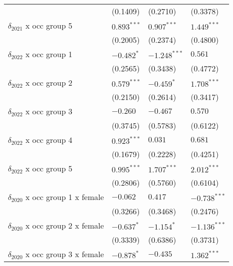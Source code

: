 \begin{tabular}{llll}
                                       &           (0.1409) &           (0.2710) &           (0.3378) \\
$\delta_{2021}$ x occ group 5          &      $0.893^{***}$ &      $0.907^{***}$ &      $1.449^{***}$ \\
                                       &           (0.2005) &           (0.2374) &           (0.4800) \\
$\delta_{2022}$ x occ group 1          &         $-0.482^*$ &     $-1.248^{***}$ &            $0.561$ \\
                                       &           (0.2565) &           (0.3438) &           (0.4772) \\
$\delta_{2022}$ x occ group 2          &      $0.579^{***}$ &         $-0.459^*$ &      $1.708^{***}$ \\
                                       &           (0.2150) &           (0.2614) &           (0.3417) \\
$\delta_{2022}$ x occ group 3          &           $-0.260$ &           $-0.467$ &            $0.570$ \\
                                       &           (0.3745) &           (0.5783) &           (0.6122) \\
$\delta_{2022}$ x occ group 4          &      $0.923^{***}$ &            $0.031$ &            $0.681$ \\
                                       &           (0.1679) &           (0.2228) &           (0.4251) \\
$\delta_{2022}$ x occ group 5          &      $0.995^{***}$ &      $1.707^{***}$ &      $2.012^{***}$ \\
                                       &           (0.2806) &           (0.5760) &           (0.6104) \\
$\delta_{2020}$ x occ group 1 x female &           $-0.062$ &            $0.417$ &     $-0.738^{***}$ \\
                                       &           (0.3266) &           (0.3468) &           (0.2476) \\
$\delta_{2020}$ x occ group 2 x female &         $-0.637^*$ &         $-1.154^*$ &     $-1.136^{***}$ \\
                                       &           (0.3339) &           (0.6386) &           (0.3731) \\
$\delta_{2020}$ x occ group 3 x female &         $-0.878^*$ &           $-0.435$ &      $1.362^{***}$ \\

\end{tabular}
